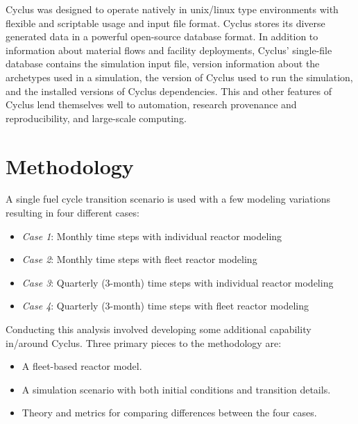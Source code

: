 \documentclass{style}
\begin{document}
Cyclus was designed to operate natively in unix/linux type environments with
flexible and scriptable usage and input file format.  Cyclus stores its
diverse generated data in a powerful open-source database format.  In addition
to information about material flows and facility deployments, Cyclus'
single-file database contains the simulation input file, version information
about the archetypes used in a simulation, the version of Cyclus used to run
the simulation, and the installed versions of Cyclus dependencies. This and
other features of Cyclus lend themselves well to automation, research
provenance and reproducibility, and large-scale computing.

\section{Methodology}

A single fuel cycle transition scenario is used with a few modeling variations
resulting in four different cases:

\begin{itemize}

    \item \emph{Case 1}: Monthly time steps with individual reactor modeling
    \item \emph{Case 2}: Monthly time steps with fleet reactor modeling
    \item \emph{Case 3}: Quarterly (3-month) time steps with individual reactor modeling
    \item \emph{Case 4}: Quarterly (3-month) time steps with fleet reactor modeling

\end{itemize}

Conducting this analysis involved developing some additional capability
in/around Cyclus.  Three primary pieces to the methodology are:

\begin{itemize}

    \item A fleet-based reactor model.

    \item A simulation scenario with both initial conditions and transition
        details.

    \item Theory and metrics for comparing differences between the four cases.

\end{itemize}
\end{document}
